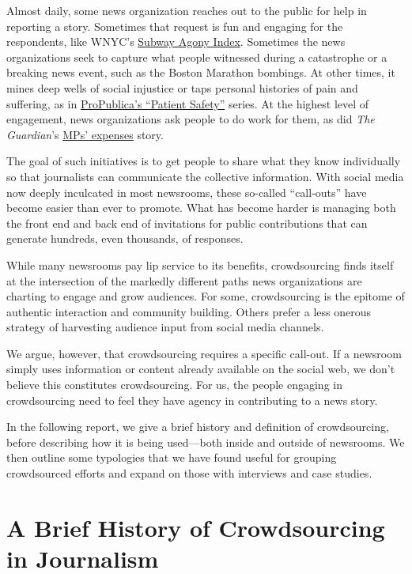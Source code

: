 \documentclass[notoc, symmetric, nobib, nols]{towcenter-guideto-book}
\begin{document}
Almost daily, some news organization reaches out to the public for help in reporting a story. Sometimes that request is fun and engaging for the respondents, like WNYC's \href{http://www.wnyc.org/story/your-subway-agony/}{Subway Agony Index}.\autocite{SubwayAgony} Sometimes the news organizations seek to capture what people witnessed during a catastrophe or a breaking news event, such as the Boston Marathon bombings. At other times, it mines deep wells of social injustice or taps personal histories of pain and suffering, as in \href{https://www.propublica.org/series/patient-safety}{ProPublica's ``Patient Safety''} series.\autocite{Safety} At the highest level of engagement, news organizations ask people to do work for them, as did \textit{The Guardian}'s \href{http://www.theguardian.com/politics/mps-expenses}{MPs' expenses} story.\autocite{MPExpense}

The goal of such initiatives is to get people to share what they know individually so that journalists can communicate the collective information. With social media now deeply inculcated in most newsrooms, these so-called ``call-outs'' have become easier than ever to promote. What has become harder is managing both the front end and back end of invitations for public contributions that can generate hundreds, even thousands, of responses.

While many newsrooms pay lip service to its benefits, crowdsourcing finds itself at the intersection of the markedly different paths news organizations are charting to engage and grow audiences. For some, crowdsourcing is the epitome of authentic interaction and community building. Others prefer a less onerous strategy of harvesting audience input from social media channels.

We argue, however, that crowdsourcing requires a specific call-out. If a newsroom simply uses information or content already available on the social web, we don't believe this constitutes crowdsourcing. For us, the people engaging in crowdsourcing need to feel they have agency in contributing to a news story.

In the following report, we give a brief history and definition of crowdsourcing, before describing how it is being used---both inside and outside of newsrooms. We then outline some typologies that we have found useful for grouping crowdsourced efforts and expand on those with interviews and case studies. 


\section{A Brief History of Crowdsourcing in Journalism}
\end{document}
